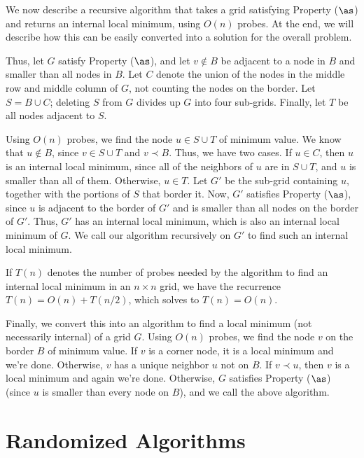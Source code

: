 \documentclass[12pt]{article}
\begin{document}
\begin{enumerate}
{We now describe a recursive algorithm that takes a grid
satisfying Property ($\as$) and returns an internal local minimum,
using $O(n)$ probes.
At the end, we will describe how this can be easily converted
into a solution for the overall problem.

Thus, let $G$ satisfy Property ($\as$), and let
$v \not\in B$ be adjacent to a node in $B$
and smaller than all nodes in $B$.
Let $C$ denote the union of the nodes in the middle row
and middle column of $G$, not counting the nodes on the border.
Let $S = B \cup C$; deleting $S$ from $G$ divides up
$G$ into four sub-grids.
Finally, let $T$ be all nodes adjacent to $S$.

Using $O(n)$ probes, we find the node $u \in S \cup T$
of minimum value.
We know that $u \not\in B$, since $v \in S \cup T$
and $v \prec B$.
Thus, we have two cases.
If $u \in C$, then $u$ is an internal local minimum,
since all of the neighbors of $u$ are in $S \cup T$,
and $u$ is smaller than all of them.
Otherwise, $u \in T$.
Let $G'$ be the sub-grid containing $u$, together
with the portions of $S$ that border it.
Now, $G'$ satisfies Property ($\as$), since $u$ is
adjacent to the border of $G'$ and is smaller
than all nodes on the border of $G'$.
Thus, $G'$ has an internal local minimum,
which is also an internal local minimum of $G$.
We call our algorithm recursively on $G'$ to find such
an internal local minimum.

If $T(n)$ denotes the number of probes needed by the algorithm to
find an internal local minimum in an $n \times n$ grid,
we have the recurrence $T(n) = O(n) + T(n/2)$, which solves to
$T(n) = O(n)$.

Finally, we convert this into an algorithm to find a local
minimum (not necessarily internal) of a grid $G$.
Using $O(n)$ probes, we find the node $v$ on the border $B$
of minimum value.
If $v$ is a corner node, it is a local minimum and we're done.
Otherwise, $v$ has a unique neighbor $u$ not on $B$.
If $v \prec u$, then $v$ is a local minimum and again we're done.
Otherwise, $G$ satisfies Property ($\as$) (since $u$
is smaller than every node on $B$), and we call the above algorithm.

}

\end{enumerate}


\section{Randomized Algorithms}
\end{document}
